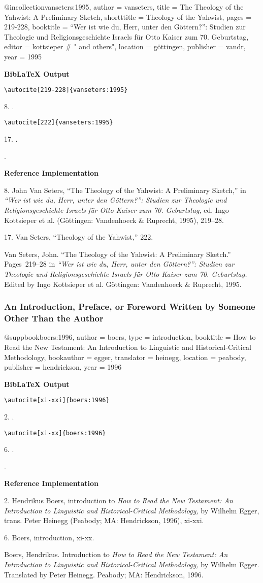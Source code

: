\documentclass[a4paper]{article}
\newcommand\citetest[5]{%
  {\textbf{BibLaTeX Output}\par
   \nobreak
   \texttt{\textbackslash autocite[#2]\{#5\}}\par
   \color{biblatex-colour}
   #1. \cite[#2]{#5}.\par
   \color{black}
   \texttt{\textbackslash autocite[#4]\{#5\}}\par
   \color{biblatex-colour}
   #3. \cite[#4]{#5}.\par
   \hangindent\bibindent\bibentrycite{#5}.\par}}
\newenvironment{refimp}{%
  \begin{minipage}{\linewidth}
    \setlength{\parskip}{1ex}
    \textbf{Reference Implementation}\par
    \nobreak
    \color{reference-colour}
}{\end{minipage}}
\newenvironment{vb}{%
  \setlength{\parskip}{0pt}
  \verbatim}{\endverbatim}
\begin{document}
\begin{vb}
@incollection{vanseters:1995,
  author = vanseters,
  title = {The Theology of the Yahwist: A Preliminary Sketch},
  shortttitle = {Theology of the Yahwist},
  pages = {219-228},
  booktitle = {“Wer ist wie du, Herr, unter den Göttern?”:
               Studien zur Theologie und Religionsgeschichte
               Israels für Otto Kaiser zum 70. Geburtstag},
  editor = kottsieper # " and others",
  location = göttingen,
  publisher = vandr,
  year = {1995}
}
\end{vb}  

\citetest{8}{219-228}{17}{222}{vanseters:1995}

\begin{refimp}
  8. John Van Seters, “The Theology of the Yahwist: A Preliminary Sketch,” in
  \emph{“Wer ist wie du, Herr, unter den Göttern?”: Studien zur Theologie und
  Religionsgeschichte Israels für Otto Kaiser zum 70. Geburtstag,} ed. Ingo
  Kottsieper et al. (Göttingen: Vandenhoeck \& Ruprecht, 1995), 219–28.

  17. Van Seters, “Theology of the Yahwist,” 222.

  \hangindent\bibindent Van Seters, John. “The Theology of the Yahwist: A
  Preliminary Sketch.” Pages~219–28 in \emph{“Wer ist wie du, Herr, unter den
  Göttern?”: Studien zur Theologie und Religionsgeschichte Israels für Otto
  Kaiser zum 70. Geburtstag.} Edited by Ingo Kottsieper et al. Göttingen:
  Vandenhoeck \& Ruprecht, 1995.
\end{refimp}

\subsubsection{An Introduction, Preface, or Foreword Written by Someone Other
Than the Author}

\begin{vb}
@suppbook{boers:1996,
  author = boers,
  type = {introduction},
  booktitle = {How to Read the New Testament: An Introduction to
               Linguistic and Historical-Critical Methodology},
  bookauthor = egger,
  translator = heinegg,
  location = peabody,
  publisher = hendrickson,
  year = {1996}
}
\end{vb}  

\citetest{2}{xi-xxi}{6}{xi-xx}{boers:1996}

\begin{refimp}
  2. Hendrikus Boers, introduction to \emph{How to Read the New Testament: An
  Introduction to Linguistic and Historical-Critical Methodology,} by Wilhelm
  Egger, trans. Peter Heinegg (Peabody; MA: Hendrickson, 1996), xi-xxi.

  6. Boers, introduction, xi-xx.

  \hangindent\bibindent Boers, Hendrikus. Introduction to \emph{How to Read
  the New Testament: An Introduction to Linguistic and Historical-Critical
  Methodology,} by Wilhelm Egger. Translated by Peter Heinegg. Peabody; MA:
  Hendrickson, 1996.
\end{refimp}
\end{document}
